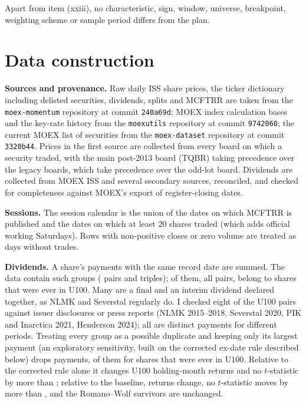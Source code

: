 \documentclass[11pt]{article}
\newcommand{\RW}{Romano--Wolf}
\begin{document}
Apart from item (xxiii), no characteristic, sign, window, universe, breakpoint, weighting scheme or sample period
differs from the plan.

\section{Data construction}\label{app:data}

\textbf{Sources and provenance.} Raw daily ISS share prices, the ticker dictionary including delisted securities,
dividends, splits
and MCFTRR are taken from the \texttt{moex-momentum} repository \citep{andreev2026moexmomentum} at commit
\texttt{240a69d}; MOEX index calculation bases and the key-rate history from the \texttt{moexutils} repository
\citep{moexutils} at commit \texttt{9742060}; the current MOEX list of securities from the \texttt{moex-dataset}
repository at commit \texttt{3320b44}. Prices in the first source are collected from every board on which a security
traded, with the main post-2013 board (TQBR) taking precedence over the legacy boards, which take precedence over the
odd-lot board. Dividends are collected from MOEX ISS and several secondary sources, reconciled, and checked for
completeness against MOEX's export of register-closing dates.

\textbf{Sessions.} The session calendar is the union of the dates on which MCFTRR is published and the dates on which at
least 20 shares traded (which adds official working Saturdays). Rows with non-positive closes or zero volume are
treated as days without trades.

\textbf{Dividends.} A share's payments with the same record date are summed. The data contain 
such groups ( pairs and  triples);  of them, all pairs,
belong to shares that were ever in U100. Many are a final and an interim dividend declared together, as NLMK and
Severstal regularly do. I checked eight of the U100 pairs against issuer disclosures or press reports (NLMK
2015--2018, Severstal 2020, PIK and Inarctica 2021, Henderson 2024); all are distinct payments for different periods.
Treating every group as a possible duplicate and keeping only its largest payment (an exploratory sensitivity, built on
the corrected ex-date rule described below) drops  payments,  of them for shares
that were ever in U100. Relative to the corrected rule alone it changes  U100 holding-month
returns and no $t$-statistic by more than ; relative to the baseline,  returns
change, no $t$-statistic moves by more than , and the \RW{} survivors are unchanged.
\end{document}
